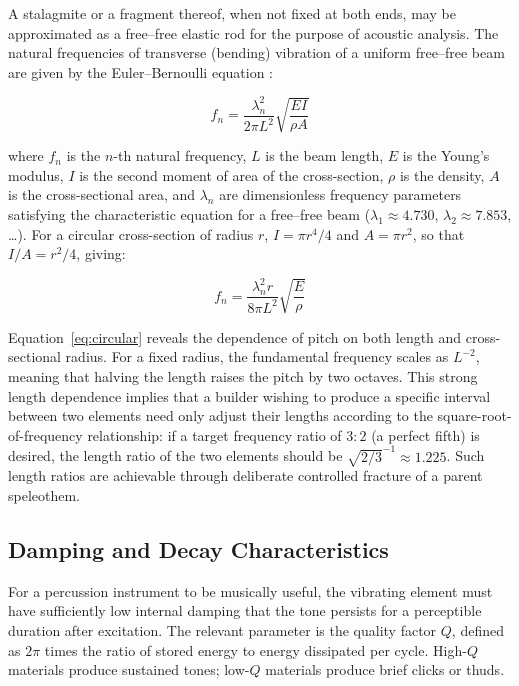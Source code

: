 \documentclass[12pt]{article}
\begin{document}
A stalagmite or a fragment thereof, when not fixed at both ends, may be approximated as a free--free elastic rod for the purpose of acoustic analysis. The natural frequencies of transverse (bending) vibration of a uniform free--free beam are given by the Euler--Bernoulli equation \citep{Timoshenko1937}:

\begin{equation}
f_n = \frac{\lambda_n^2}{2\pi L^2} \sqrt{\frac{EI}{\rho A}} \label{eq:euler}
\end{equation}

where $f_n$ is the $n$-th natural frequency, $L$ is the beam length, $E$ is the Young's modulus, $I$ is the second moment of area of the cross-section, $\rho$ is the density, $A$ is the cross-sectional area, and $\lambda_n$ are dimensionless frequency parameters satisfying the characteristic equation for a free--free beam ($\lambda_1 \approx 4.730$, $\lambda_2 \approx 7.853$, \ldots). For a circular cross-section of radius $r$, $I = \pi r^4 / 4$ and $A = \pi r^2$, so that $I/A = r^2/4$, giving:

\begin{equation}
f_n = \frac{\lambda_n^2 r}{8\pi L^2} \sqrt{\frac{E}{\rho}} \label{eq:circular}
\end{equation}

Equation~\eqref{eq:circular} reveals the dependence of pitch on both length and cross-sectional radius. For a fixed radius, the fundamental frequency scales as $L^{-2}$, meaning that halving the length raises the pitch by two octaves. This strong length dependence implies that a builder wishing to produce a specific interval between two elements need only adjust their lengths according to the square-root-of-frequency relationship: if a target frequency ratio of $3{:}2$ (a perfect fifth) is desired, the length ratio of the two elements should be $\sqrt{2/3}^{-1} \approx 1.225$. Such length ratios are achievable through deliberate controlled fracture of a parent speleothem.

\subsection{Damping and Decay Characteristics}

For a percussion instrument to be musically useful, the vibrating element must have sufficiently low internal damping that the tone persists for a perceptible duration after excitation. The relevant parameter is the quality factor $Q$, defined as $2\pi$ times the ratio of stored energy to energy dissipated per cycle. High-$Q$ materials produce sustained tones; low-$Q$ materials produce brief clicks or thuds.
\end{document}
